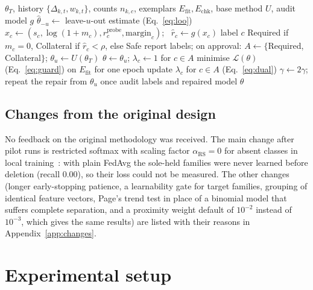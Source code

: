 \documentclass[pdflatex,sn-mathphys-num,iicol]{sn-jnl}
\newcommand{\Efit}{E_{\mathrm{fit}}}
\newcommand{\Echk}{E_{\mathrm{chk}}}
\newcommand{\rprobe}{r^{\mathrm{probe}}_c}
\begin{document}
\begin{algorithm}[t]
\caption{CAPRI for a deletion request of client $u$}\label{alg:capri}
\footnotesize
\begin{algorithmic}[1]
\Require $\theta_T$, history $\{\Delta_{k,t},w_{k,t}\}$, counts $n_{k,c}$, exemplars $\Efit,\Echk$, base method $U$, audit model $g$
\State $\hat\theta_{-u}\gets$ leave-$u$-out estimate (Eq.~\ref{eq:loo})
  \State $x_c\gets(s_c,\log(1+m_c),\rprobe,\mathrm{margin}_c)$; \ $\hat r_c\gets g(x_c)$
  \State label $c$ Required if $m_c=0$, Collateral if $\hat r_c<\rho$, else Safe
\EndFor
\State report labels; on approval: $A\gets\{$Required, Collateral$\}$; $\theta_u\gets U(\theta_T)$
\State $\theta\gets\theta_u$; $\lambda_c\gets1$ for $c\in A$
  \State minimise $\mathcal{L}(\theta)$ (Eq.~\ref{eq:guard}) on $\Efit$ for one epoch
  \State update $\lambda_c$ for $c\in A$ (Eq.~\ref{eq:dual})
\EndFor
{}
  \State $\gamma\gets2\gamma$; repeat the repair from $\theta_u$ once
\EndIf
\State \Return audit labels and repaired model $\theta$
\end{algorithmic}
\end{algorithm}

\subsection{Changes from the original design}\label{sec:changes}

No feedback on the original methodology was received. The main change after pilot runs is restricted softmax with scaling factor $\alpha_{\mathrm{RS}}=0$ for absent classes in local training~\cite{li2021fedrs}: with plain FedAvg the sole-held families were never learned before deletion (recall 0.00), so their loss could not be measured. The other changes (longer early-stopping patience, a learnability gate for target families, grouping of identical feature vectors, Page's trend test in place of a binomial model that suffers complete separation, and a proximity weight default of $10^{-2}$ instead of $10^{-3}$, which gives the same results) are listed with their reasons in Appendix~\ref{app:changes}.

\section{Experimental setup}\label{sec:setup}
\end{document}
